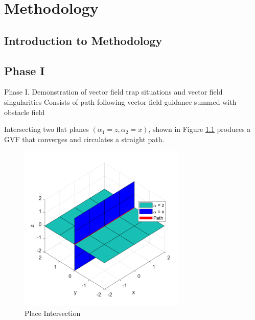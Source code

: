 \documentclass[numbered,pdftex]{ohio-etd}
\begin{document}
\chapter{Methodology}
\section{Introduction to Methodology}
\section{Phase I}

Phase I. Demonstration of vector field trap situations and vector field singularities
Consists of path following vector field guidance summed with obstacle field 



Intersecting two flat planes $(\alpha_1 = z,\alpha_2 = x)$, shown in Figure \ref{fig:planeIntersection} produces a GVF that converges and circulates a straight path.


\begin{figure}[H]
	\centering
	\includegraphics[width=8cm]{Figures/planeIntersection}
	\caption{Place Intersection}
	\label{fig:planeIntersection}
\end{figure}
\end{document}
